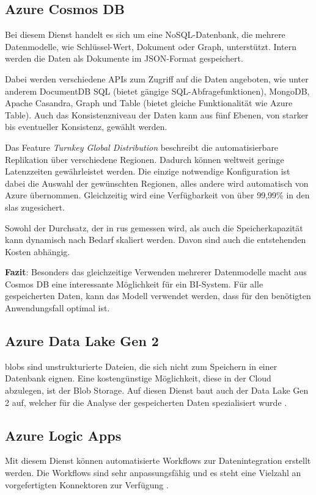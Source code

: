 \subsection{Azure Cosmos DB} \label{sec:grundlagen:azure_dienste:cosmosDB}
Bei diesem Dienst handelt es sich um eine NoSQL-Datenbank, die mehrere Datenmodelle, wie Schlüssel-Wert, Dokument oder Graph, unterstützt. Intern werden die Daten als Dokumente im JSON-Format gespeichert.

Dabei werden verschiedene APIs zum Zugriff auf die Daten angeboten, wie unter anderem DocumentDB SQL (bietet gängige SQL-Abfragefunktionen), MongoDB, Apache Casandra, Graph und Table (bietet gleiche Funktionalität wie Azure Table). Auch das Konsistenzniveau der Daten kann aus fünf Ebenen, von starker bis eventueller Konsistenz, gewählt werden.

Das Feature \textit{Turnkey Global Distribution} beschreibt die automatisierbare Replikation über verschiedene Regionen. Dadurch können weltweit geringe Latenzzeiten gewährleistet werden. Die einzige notwendige Konfiguration ist dabei die Auswahl der gewünschten Regionen, alles andere wird automatisch von Azure übernommen. Gleichzeitig wird eine Verfügbarkeit von über 99,99\% in den \acp{sla} zugesichert.

Sowohl der Durchsatz, der in \acp{ru} gemessen wird, als auch die Speicherkapazität kann dynamisch nach Bedarf skaliert werden. Davon sind auch die entstehenden Kosten abhängig.
\cite{guay_paz_introduction_2018}\cite{mrzyglod_hands-azure_2018}

\textbf{Fazit}: Besonders das gleichzeitige Verwenden mehrerer Datenmodelle macht aus Cosmos DB eine interessante Möglichkeit für ein BI-System. Für alle gespeicherten Daten, kann das Modell verwendet werden, dass für den benötigten Anwendungsfall optimal ist.

\subsection{Azure Data Lake Gen 2} \label{sec:grundlagen:azure_dienste:dataLake}
\acp{blob} sind unstrukturierte Dateien, die sich nicht zum Speichern in einer Datenbank eignen. Eine kostengünstige Möglichkeit, diese in der Cloud abzulegen, ist der Blob Storage. Auf diesen Dienst baut auch der Data Lake Gen 2 auf, welcher für die Analyse der gespeicherten Daten spezialisiert wurde \cite{soh_azure_2020}.

\subsection{Azure Logic Apps} \label{sec:grundlagen:azure_dienste:logicApps}
Mit diesem Dienst können automatisierte Workflows zur Datenintegration erstellt werden. Die Workflows sind sehr anpassungsfähig und es steht eine Vielzahl an vorgefertigten Konnektoren zur Verfügung \cite{kumar_serverless_2019}.

